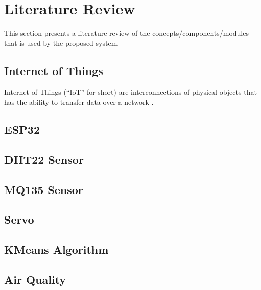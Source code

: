 \section{Literature Review}

This section presents a literature review of the concepts/components/modules that is used by the proposed system.

\subsection{Internet of Things}
Internet of Things (``IoT'' for short) are interconnections of physical objects that has the ability to transfer data over a network \cite{iot}.


\subsection{ESP32}


\subsection{DHT22 Sensor}

\subsection{MQ135 Sensor}

\subsection{Servo}

\subsection{KMeans Algorithm}

\subsection{Air Quality}
